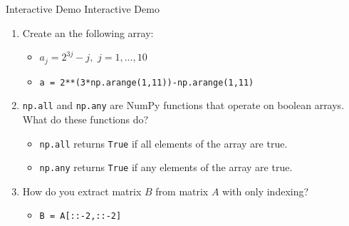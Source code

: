 \documentclass[serif,xcolor=pdftex,dvipsnames,table,hyperref={bookmarks=false,breaklinks}]{beamer}
\begin{document}
\begin{frame}[t,fragile]{Interactive Demo}
	\centering
	\Huge{Interactive Demo}
	\normalsize
	\begin{enumerate}
		\item Create an the following array:
		\begin{itemize}
			\item $a_j = 2^{3j} - j,\,\,j = 1,...,10$
			\item \verb|a = 2**(3*np.arange(1,11))-np.arange(1,11)|
		\end{itemize}
		\item \verb|np.all| and \verb|np.any| are NumPy functions that operate on boolean arrays. What do these functions do?
		\begin{itemize}
			\item \verb|np.all| returns \verb|True| if all elements of the array are true.
			\item \verb|np.any| returns \verb|True| if any elements of the array are true.
		\end{itemize}
		\item How do you extract matrix $B$ from matrix $A$ with only indexing?
		\begin{itemize}
			\item \verb|B = A[::-2,::-2]|
		\end{itemize}
	\end{enumerate}
	
\end{frame}
\end{document}

